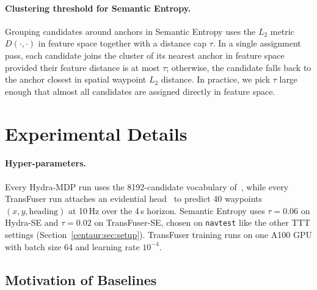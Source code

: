 \paragraph{Clustering threshold for Semantic Entropy.} Grouping candidates around anchors in Semantic Entropy uses the $L_2$ metric $D(\cdot, \cdot)$ in feature space together with a distance cap $\tau$. In a single assignment pass, each candidate joins the cluster of its nearest anchor in feature space provided their feature distance is at most $\tau$; otherwise, the candidate falls back to the anchor closest in spatial waypoint $L_2$ distance. In practice, we pick $\tau$ large enough that almost all candidates are assigned directly in feature space.

\section{Experimental Details}\label{centaur:app:exp}

\paragraph{Hyper-parameters.} Every Hydra-MDP run uses the 8192-candidate vocabulary of~\cite{li2024hydramdp}, while every TransFuser run attaches an evidential head~\cite{amini2020deepevidential} to predict 40 waypoints $(x, y, \text{heading})$ at 10\,Hz over the 4\,s horizon. Semantic Entropy uses $\tau=0.06$ on Hydra-SE and $\tau=0.02$ on TransFuser-SE, chosen on \texttt{navtest} like the other TTT settings (Section~\ref{centaur:sec:setup}). TransFuser training runs on one A100 GPU with batch size 64 and learning rate $10^{-4}$.

\subsection{Motivation of Baselines}\label{centaur:app:baselines}

